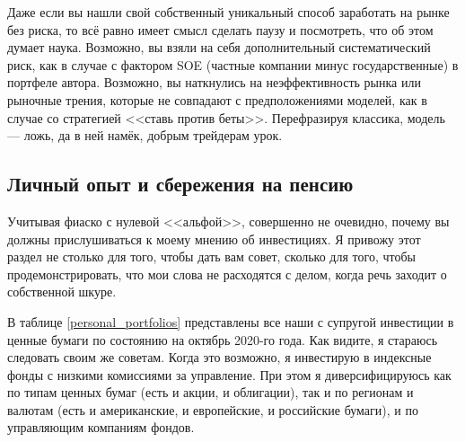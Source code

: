Даже если вы нашли свой собственный уникальный способ заработать на рынке без
риска, то всё равно имеет смысл сделать паузу и посмотреть, что об этом думает
наука. Возможно, вы взяли на себя дополнительный систематический риск, как в
случае с фактором SOE (частные компании минус государственные) в портфеле 
автора. Возможно, вы наткнулись на неэффективность рынка или рыночные трения, 
которые не совпадают с предположениями моделей, как в случае со стратегией 
<<ставь против беты>>. Перефразируя классика, модель --- ложь, да в ней намёк, 
добрым трейдерам урок.

\subsection{Личный опыт и сбережения на пенсию}

Учитывая фиаско с нулевой <<альфой>>, совершенно не очевидно, почему вы должны
прислушиваться к моему мнению об инвестициях. Я привожу этот раздел не столько
для того, чтобы дать вам совет, сколько для того, чтобы продемонстрировать, что
мои слова не расходятся с делом, когда речь заходит о собственной шкуре.

В таблице \ref{personal_portfolios} представлены все наши с супругой инвестиции
в ценные бумаги по состоянию на октябрь 2020-го года. Как видите, я стараюсь
следовать своим же советам. Когда это возможно, я инвестирую в индексные фонды 
с низкими комиссиями за управление. При этом я диверсифицируюсь как по типам
ценных бумаг (есть и акции, и облигации), так и по регионам и валютам (есть и
американские, и европейские, и российские бумаги), и по управляющим компаниям 
фондов.

